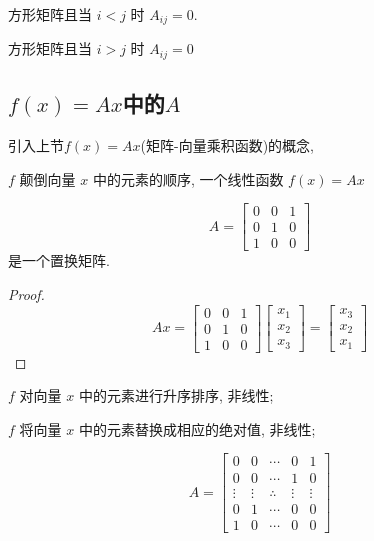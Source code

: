 \begin{definition}[下三角矩阵]
    方形矩阵且当 $ i<j $ 时 $ A_{i j}=0 $.
\end{definition}

\begin{definition}[上三角矩阵]
    方形矩阵且当 $ i>j $ 时 $ A_{i j}=0 $
\end{definition}

\subsection{$f(x)=A x$中的$A$}

引入上节$f(x)=A x$(矩阵-向量乘积函数)的概念,

\begin{example}
    $ f $ 颠倒向量 $ x $ 中的元素的顺序, 一个线性函数 $ f(x)=A x $

    $$ A=\left[\begin{array}{lll}0 & 0 & 1 \\ 0 & 1 & 0 \\ 1 & 0 & 0\end{array}\right] $$是一个置换矩阵.
\end{example}

\begin{proof}
    $$ A x=\left[\begin{array}{lll}0 & 0 & 1 \\ 0 & 1 & 0 \\ 1 & 0 & 0\end{array}\right]\left[\begin{array}{l}x_{1} \\ x_{2} \\ x_{3}\end{array}\right]=\left[\begin{array}{l}x_{3} \\ x_{2} \\ x_{1}\end{array}\right] $$
\end{proof}

\begin{example}
    $ f $ 对向量 $ x $ 中的元素进行升序排序, 非线性;
\end{example}

\begin{example}
    $ f $ 将向量 $ x $ 中的元素替换成相应的绝对值, 非线性;
\end{example}

\begin{example}[反转矩阵]
    $$ A=\left[\begin{array}{ccccc}0 & 0 & \cdots & 0 & 1 \\ 0 & 0 & \cdots & 1 & 0 \\ \vdots & \vdots & \therefore & \vdots & \vdots \\ 0 & 1 & \cdots & 0 & 0 \\ 1 & 0 & \cdots & 0 & 0\end{array}\right] $$
\end{example}

